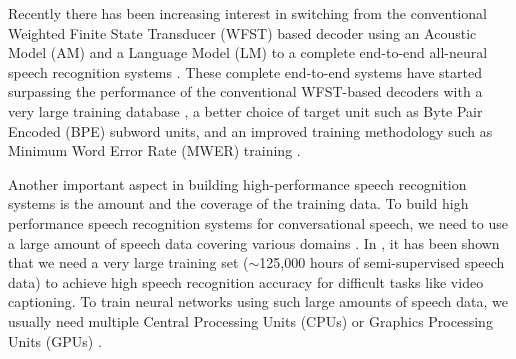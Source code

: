 \documentclass{article}
\begin{document}
Recently there has been increasing interest in switching
from the conventional Weighted Finite State Transducer (WFST)
based decoder using an Acoustic Model (AM) and a Language Model (LM)
to a complete end-to-end all-neural speech recognition systems 
\cite{w_chan_icassp_2016_00, r_prabhavalkar_interspeech_2017_00, 
j_chorowski_nips_2015_00}. 
These complete end-to-end systems have started surpassing the performance of
the conventional WFST-based decoders with a very large training 
database \cite{c_chiu_icassp_2018_00}, a better choice of target unit 
such as Byte Pair Encoded (BPE) subword units, and an improved 
training methodology such as Minimum
Word Error Rate (MWER) training \cite{r_Prabhavalkar_icassp_2018_00}.

Another important aspect in building high-performance 
speech recognition systems is the amount
and the coverage of the training data.
To build high performance speech recognition systems for
conversational speech, we need to use
a large amount of speech data covering various domains
\cite{a_narayanan_slt_2018_00}. In \cite{h_soltau_interspeech_2017_00}, 
it has been shown that we need a very large training set ($\sim$125,000 hours of 
semi-supervised speech data) to achieve
high speech recognition accuracy for difficult tasks like 
video captioning. To train neural networks using such large 
amounts of speech data, we usually need 
multiple Central Processing Units (CPUs) or Graphics
Processing Units (GPUs)
\cite{E_Variani_INTERSPEECH_2017_01, p_goyal_arxiv_2018_00}.
\end{document}
